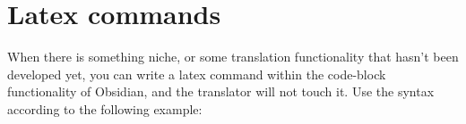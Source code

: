 \documentclass{extarticle}
\begin{document}




\section{Latex commands}

When there is something niche, or some translation functionality that hasn't been developed yet, you can write a latex command within the code-block functionality of Obsidian, and the translator will not touch it. Use the syntax according to the following example:





\lipsum[1-4]




\newpage 
\newpage 







\end{document}
